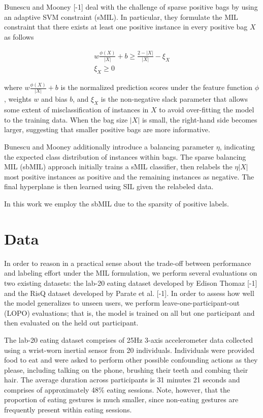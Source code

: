 \documentclass{sigchi}
\begin{document}
Bunescu and Mooney [-1] deal with the challenge of sparse positive bags by using an adaptive SVM constraint (sMIL). In particular, they formulate the MIL constraint that there exists at least one positive instance in every positive bag $X$ as follows

\begin{align*}
	w \frac{\phi(X)}{\left| X \right|} + b \geq \frac{2 - \left| X \right|}{\left| X \right|} - \xi_X \\
	\xi_X \geq 0
\end{align*}

where $w \frac{\phi(X)}{\left| X \right|} + b$ is the normalized prediction scores under the feature function $\phi$, weights $w$ and bias $b$, and $\xi_X$ is the non-negative slack parameter that allows some extent of misclassification of instances in $X$ to avoid over-fitting the model to the training data. When the bag size $\left| X \right|$ is small, the right-hand side becomes larger, suggesting that smaller positive bags are more informative.

Bunescu and Mooney additionally introduce a balancing parameter $\eta$, indicating the expected class distribution of instances within bags. The sparse balancing MIL (sbMIL) approach initially trains a sMIL classifier, then relabels the $\eta \left| X \right|$ most positive instances as positive and the remaining instances as negative. The final hyperplane is then learned using SIL given the relabeled data.

In this work we employ the sbMIL due to the sparsity of positive labels.

\section{Data}

In order to reason in a practical sense about the trade-off between performance and labeling effort under the MIL formulation, we perform several evaluations on two existing datasets: the lab-20 eating dataset developed by Edison Thomaz [-1] and the RisQ dataset developed by Parate et al. [-1]. In order to assess how well the model generalizes to unseen users, we perform leave-one-participant-out (LOPO) evaluations; that is, the model is trained on all but one participant and then evaluated on the held out participant.

The lab-20 eating dataset comprises of 25Hz 3-axis accelerometer data collected using a wrist-worn inertial sensor from 20 individuals. Individuals were provided food to eat and were asked to perform other possible confounding actions as they please, including talking on the phone, brushing their teeth and combing their hair. The average duration across participants is 31 minutes 21 seconds and comprises of approximately 48\% eating sessions. Note, however, that the proportion of eating gestures is much smaller, since non-eating gestures are frequently present within eating sessions.
\end{document}
